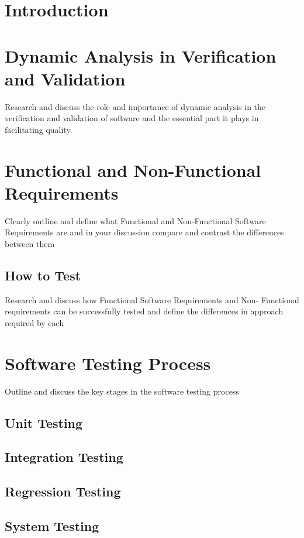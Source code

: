 \documentclass[12pt]{article}
\begin{document}
\section{Introduction}



\section{Dynamic Analysis in Verification and Validation}
Research and discuss the role and importance of dynamic analysis in the verification and validation of software and the essential part it plays in facilitating quality.



\section{Functional and Non-Functional Requirements}
Clearly outline and define what Functional and Non-Functional Software Requirements are and in your discussion compare and contrast the differences between them

\subsection{How to Test}
Research and discuss how Functional Software Requirements and Non- Functional requirements can be successfully tested and define the differences in approach required by each



\section{Software Testing Process}
Outline and discuss the key stages in the software testing process

\subsection{Unit Testing}

\subsection{Integration Testing}

\subsection{Regression Testing}

\subsection{System Testing}
\end{document}
